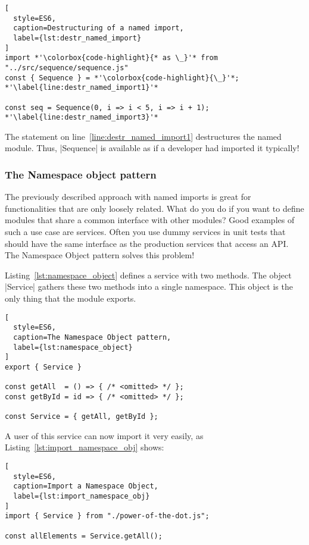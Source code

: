 \begin{lstlisting}[
  style=ES6,
  caption=Destructuring of a named import,
  label={lst:destr_named_import}
]
import *'\colorbox{code-highlight}{* as \_}'* from "../src/sequence/sequence.js" 
const { Sequence } = *'\colorbox{code-highlight}{\_}'*; *'\label{line:destr_named_import1}'*

const seq = Sequence(0, i => i < 5, i => i + 1); *'\label{line:destr_named_import3}'*
\end{lstlisting}

The statement on line~\ref{line:destr_named_import1} destructures the named
module. Thus, |Sequence| is available as if a developer had imported it
typically!


\subsubsection{The Namespace object pattern} %
\label{subsub:The Namespace Object Pattern}
The previously described approach with named imports is great for
functionalities that are only loosely related. What do you do if you want to
define modules that share a common interface with other modules? Good examples
of such a use case are services. Often you use dummy services in unit tests
that should have the same interface as the production services that access an
API. The Namespace Object pattern solves this problem!

Listing~\ref{lst:namespace_object} defines a service with two methods. The
object |Service| gathers these two methods into a single namespace. This object
is the only thing that the module exports.

\begin{lstlisting}[
  style=ES6,
  caption=The Namespace Object pattern,
  label={lst:namespace_object}
]
export { Service }

const getAll  = () => { /* <omitted> */ };
const getById = id => { /* <omitted> */ };

const Service = { getAll, getById };
\end{lstlisting}

A user of this service can now import it very easily, as
Listing~\ref{lst:import_namespace_obj} shows:

\begin{lstlisting}[
  style=ES6,
  caption=Import a Namespace Object,
  label={lst:import_namespace_obj}
]
import { Service } from "./power-of-the-dot.js";

const allElements = Service.getAll();
\end{lstlisting}

